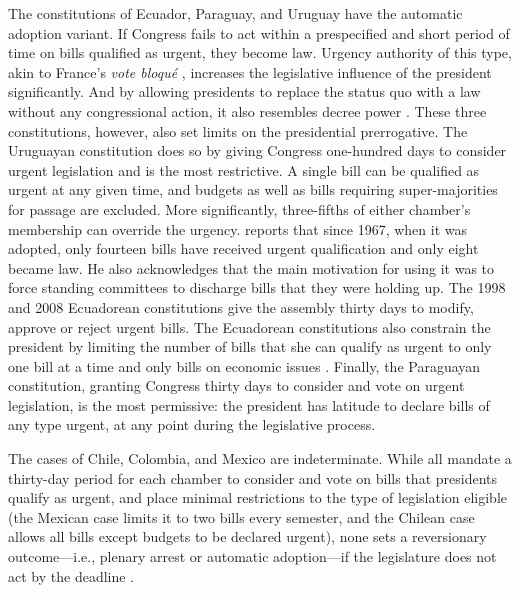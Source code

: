 \documentclass[letter,12pt]{article}
\begin{document}
The constitutions of Ecuador, Paraguay, and Uruguay have the automatic adoption variant. If Congress fails to act within a prespecified and short period of time on bills qualified as urgent, they become law. Urgency authority of this type, akin to France's \emph{vote bloqu\'e} \citep{huber.1996b}, increases the legislative influence of the president significantly. And by allowing presidents to replace the status quo with a law without any congressional action, it also resembles decree power \citep{carey.shugart.1998}. These three constitutions, however, also set limits on the presidential prerrogative. The Uruguayan constitution does so by giving Congress one-hundred days to consider urgent legislation and is the most restrictive. A single bill can be qualified as urgent at any given time, and budgets as well as bills requiring super-majorities for passage are excluded. More significantly, three-fifths of either chamber's membership can override the urgency. \citet{chasquetti.2016} reports that since 1967, when it was adopted, only fourteen bills have received urgent qualification and only eight became law. He also acknowledges that the main motivation for using it was to force standing committees to discharge bills that they were holding up. The 1998 and 2008 Ecuadorean constitutions give the assembly thirty days to modify, approve or reject urgent bills. The Ecuadorean constitutions also constrain the president by limiting the number of bills that she can qualify as urgent to only one bill at a time and only bills on economic issues \citep{morgenstern-polga-shair.2013}. Finally, the Paraguayan constitution, granting Congress thirty days to consider and vote on urgent legislation, is the most permissive: the president has latitude to declare bills of any type urgent, at any point during the legislative process.

The cases of Chile, Colombia, and Mexico are indeterminate. While all mandate a thirty-day period for each chamber to consider and vote on bills that presidents qualify as urgent, and place minimal restrictions to the type of legislation eligible (the Mexican case limits it to two bills every semester, and the Chilean case allows all bills except budgets to be declared urgent), none sets a reversionary outcome---i.e., plenary arrest or automatic adoption---if the legislature does not act by the deadline \citep{nolte.2003,sotoCongChile2015,carroll-pachon.2016,magar.2014-refConst}.
\end{document}
